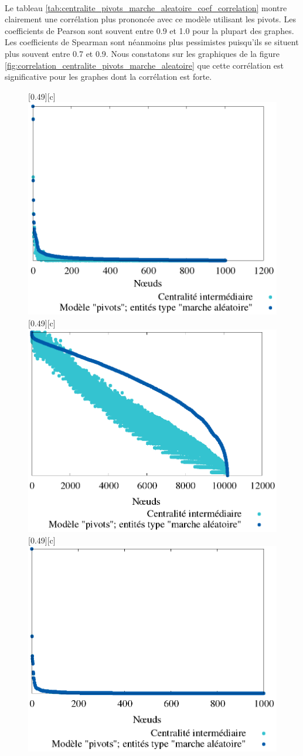\documentclass[a4paper, 10pt]{report}
\begin{document}
\paragraph{}Le tableau \ref{tab:centralite_pivots_marche_aleatoire_coef_correlation} montre clairement une corrélation plus prononcée avec ce modèle utilisant les pivots. Les coefficients de Pearson sont souvent entre 0.9 et 1.0 pour la plupart des graphes. Les coefficients de Spearman sont néanmoins plus pessimistes puisqu'ils se situent plus souvent entre 0.7 et 0.9. Nous constatons sur les graphiques de la figure \ref{fig:correlation_centralite_pivots_marche_aleatoire} que cette corrélation est significative pour les graphes dont la corrélation est forte.

\begin{figure}[htbp]
	\centering
	[0.49\linewidth][c]{
		\includegraphics[width=0.49\linewidth]{./img/pivots_marche_aleatoire_dorogovstev_mendes.png}
	}
	\hfill
	[0.49\linewidth][c]{
		\includegraphics[width=0.49\linewidth]{./img/pivots_marche_aleatoire_grille_10000.png}
	}
	\hfill
	[0.49\linewidth][c]{
		\includegraphics[width=0.49\linewidth]{./img/pivots_marche_aleatoire_preferential_attachement_1000_1.png}
}
\end{figure}
\end{document}
